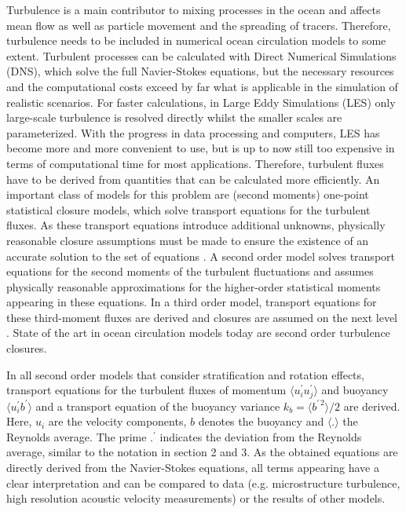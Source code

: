 Turbulence is a main contributor to mixing processes in the ocean and affects 
mean flow as well as particle movement and the spreading of tracers. Therefore, 
turbulence needs to be included in numerical ocean circulation models to some 
extent. Turbulent processes can be calculated with Direct Numerical Simulations 
(DNS), which solve the full Navier-Stokes equations, but the necessary resources 
and the computational costs exceed by far what is applicable in the simulation 
of 
realistic scenarios. For faster calculations, in Large Eddy Simulations (LES) 
only large-scale turbulence is resolved directly whilst the smaller scales are 
parameterized. With the progress in data processing and computers, LES has 
become more 
and more convenient to use, but is up to now still too expensive in terms of 
computational time for most 
applications. Therefore, turbulent fluxes have to be derived from quantities 
that can be calculated more efficiently. An important class of models for this 
problem are (second moments) one-point statistical closure models, which solve 
transport equations for the turbulent fluxes. As these transport equations  
introduce additional unknowns, physically reasonable closure assumptions must 
be made 
to ensure the existence of an accurate solution 
to the set of equations \citep[][]{UmlaufBurchard2005a}. A second order model 
solves transport equations for the second moments of the turbulent fluctuations 
and assumes physically 
reasonable approximations for the higher-order statistical moments appearing in 
these equations. In a 
third order model, transport equations for these third-moment fluxes are derived 
and closures are assumed on the next level \citep[e.g. in][]{sander1998}. State 
of the art in ocean circulation models today are second order turbulence 
closures. 

In all second order models that consider stratification and rotation effects, 
transport equations for the turbulent fluxes of momentum $\langle u_i^\prime 
u_j^\prime \rangle$ and buoyancy $\langle 
u_i^\prime b^\prime \rangle$ and a transport equation of the buoyancy variance 
$k_b = \langle b^{\prime \, 2} \rangle \slash 2 $ are derived. Here, $u_i$ 
are the velocity components, $b$ denotes the buoyancy and $\langle . \rangle$ 
the Reynolds average. The prime $.^\prime$ indicates the deviation from the 
Reynolds average, similar to the notation in section 2 and 3. As the obtained 
equations are directly derived from the Navier-Stokes equations, all terms 
appearing have a clear 
interpretation and can be compared to data (e.g. microstructure turbulence, high 
resolution acoustic velocity measurements) or the results of other models.  

